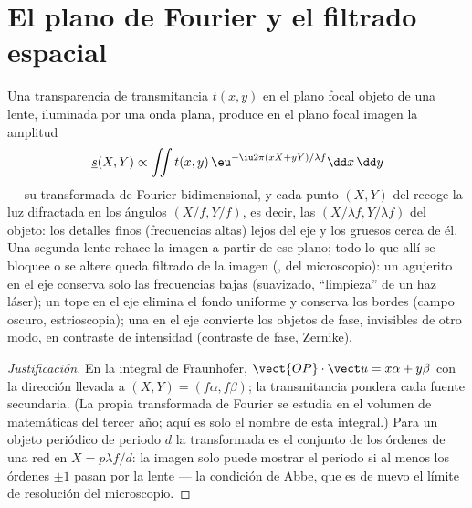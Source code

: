 \section{El plano de Fourier y el filtrado espacial}

\begin{proposition}\label{prop:b2:diffraction:fourier}
Una transparencia de transmitancia $t(x, y)$ en el plano focal objeto de una
lente, iluminada por una onda plana, produce en el plano focal imagen la
amplitud
\[
\underline s(X, Y) \propto \iint t(x, y)\,\eu^{-\iu2\pi(xX + yY)/\lambda f}\dd x\,\dd y
\]
--- su transformada de Fourier bidimensional, y cada punto $(X, Y)$ del
\emph{} recoge la luz difractada en los ángulos
$(X/f, Y/f)$, es decir, las \emph{} $(X/\lambda f, Y/\lambda f)$ del
objeto: los detalles finos (frecuencias altas) lejos del eje y los gruesos
cerca de él. Una segunda lente rehace la imagen a partir de ese plano; todo lo
que allí se bloquee o se altere queda filtrado de la imagen
(\emph{},  del microscopio): un agujerito
en el eje conserva solo las frecuencias bajas (suavizado, ``limpieza'' de un
haz láser); un tope en el eje elimina el fondo uniforme y
conserva los bordes (campo oscuro, estrioscopia); una  en el
eje convierte los objetos de fase, invisibles de otro modo, en contraste de intensidad
(contraste de fase, Zernike).
\end{proposition}

\begin{proof}[Justificación]
En la integral de Fraunhofer, $\vect{OP}\cdot\vect u = x\alpha + y\beta$ con la
dirección llevada a $(X, Y) = (f\alpha, f\beta)$; la transmitancia pondera
cada fuente secundaria. (La propia transformada de Fourier se estudia en el
volumen de matemáticas del tercer año; aquí es solo el nombre de esta integral.)
Para un objeto periódico de periodo $d$ la transformada es el conjunto de los órdenes
de una red en $X = p\lambda f/d$: la imagen solo puede mostrar el periodo si al menos
los órdenes $\pm1$ pasan por la lente --- la condición de Abbe, que es
de nuevo el límite de resolución del microscopio.
\end{proof}

